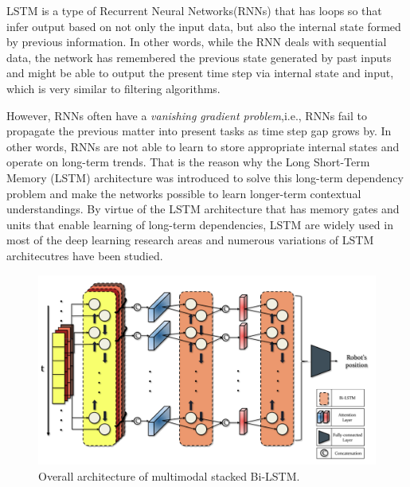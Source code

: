 \documentclass[letterpaper, 10 pt, conference]{ieeeconf}  %
\begin{document}
LSTM is a type of Recurrent Neural Networks(RNNs) that has loops so that infer output based on not only the input data, but also the internal state formed by previous information. In other words, while the RNN deals with sequential data, the network has remembered the previous state generated by past inputs and might be able to output the present time step via internal state and input, which is very similar to filtering algorithms.

However, RNNs often have a \textit{vanishing gradient problem},i.e., RNNs fail to propagate the previous matter into present tasks as time step gap grows by. In other words, RNNs are not able to learn to store appropriate internal states and operate on long-term trends. That is the reason why the Long Short-Term Memory (LSTM) architecture was introduced to solve this long-term dependency problem and make the networks possible to learn longer-term contextual understandings\cite{hochreiter1997long}.
By virtue of the LSTM architecture that has memory gates and units that enable learning of long-term dependencies\cite{zaremba2014learning}, LSTM are widely used in most of the deep learning research areas and numerous variations of LSTM architecutres have been studied.

\begin{figure}[ht]
	
	\centering
	\includegraphics[height=10 cm]{CE554_networks}
	
	\label{fig:example}
	
	\caption{Overall architecture of multimodal stacked Bi-LSTM. }
	
\end{figure}
\end{document}
